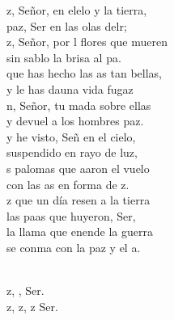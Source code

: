 \begin{cancion}%
	z, Señor, en elelo y la tierra,\\
	paz, Ser en las olas delr;\\
	z, Señor, por l flores que mueren\\
	sin sablo la brisa al pa.\\
	 que has hecho las as tan bellas, \\
	y le has dauna vida fugaz\\
	n, Señor, tu mada sobre ellas\\
	y devuel a los hombres paz.\\
	y he visto, Señ en el cielo, \\
	suspendido en rayo de luz,\\
	s palomas que aaron el vuelo\\
	con las as en forma de z.\\
	z que un día resen a la tierra\\
	las paas que huyeron, Ser,\\
	la llama que enende la guerra\\
	se conma con la paz y el a.\\\jump\\
	\begin{chorus}%
	z, ,  Ser.\\
	z, z, z Ser.\\
	\end{chorus}%
	\jump\\
\end{cancion}%
